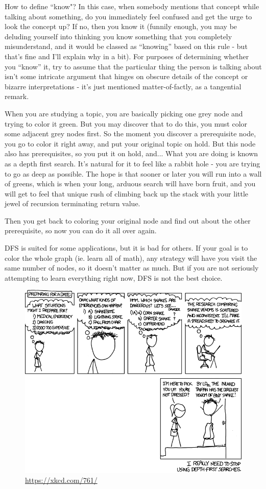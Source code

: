 How to define ``know"? In this case, when somebody mentions that concept while
talking about something, do you immediately feel confused and get the urge to
look the concept up? If no, then you know it (funnily enough, you may be
deluding yourself into thinking you know something that you completely
misunderstand, and it would be classed as ``knowing'' based on this rule - but
that's fine and I'll explain why in a bit). For purposes of determining
whether you ``know'' it, try to assume that the particular thing the person is
talking about isn't some intricate argument that hinges on obscure details of
the concept or bizarre interpretations - it's just mentioned matter-of-factly,
as a tangential remark.

When you are studying a topic, you are basically picking one grey node and
trying to color it green. But you may discover that to do this, you must color
some adjacent grey nodes first. So the moment you discover a prerequisite
node, you go to color it right away, and put your original topic on hold. But
this node also has prerequisites, so you put it on hold, and... What you are
doing is known as a depth first search. It's natural for it to feel like a
rabbit hole - you are trying to go as deep as possible. The hope is that
sooner or later you will run into a wall of greens, which is when your long,
arduous search will have born fruit, and you will get to feel that unique rush
of climbing back up the stack with your little jewel of recursion terminating
return value.

Then you get back to coloring your original node and find out about the other
prerequisite, so now you can do it all over again.

DFS is suited for some applications, but it is bad for others. If your goal is
to color the whole graph (ie. learn all of math), any strategy will have you
visit the same number of nodes, so it doesn't matter as much. But if you are
not seriously attempting to learn everything right now, DFS is not the best
choice.

\begin{figure}[H]
    \centering
    \includegraphics[width=.8\textwidth]{Pics/dfs.png}
    \captionsetup{labelformat=empty}
    \caption{\url{https://xkcd.com/761/}}
\end{figure}


